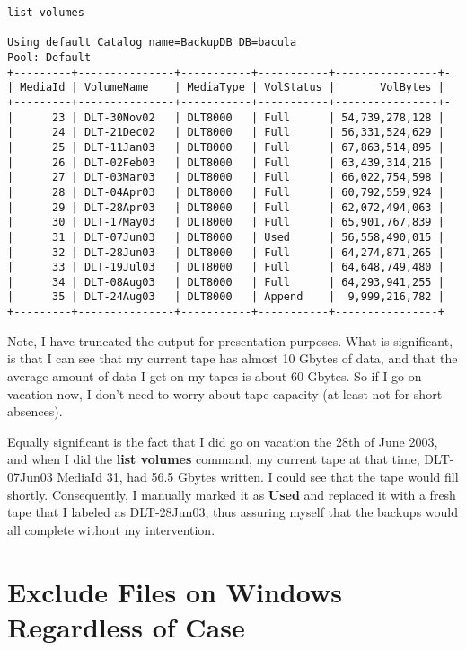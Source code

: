\footnotesize
\begin{verbatim}
list volumes
 
Using default Catalog name=BackupDB DB=bacula
Pool: Default
+---------+---------------+-----------+-----------+----------------+-
| MediaId | VolumeName    | MediaType | VolStatus |       VolBytes |
+---------+---------------+-----------+-----------+----------------+-
|      23 | DLT-30Nov02   | DLT8000   | Full      | 54,739,278,128 |
|      24 | DLT-21Dec02   | DLT8000   | Full      | 56,331,524,629 |
|      25 | DLT-11Jan03   | DLT8000   | Full      | 67,863,514,895 |
|      26 | DLT-02Feb03   | DLT8000   | Full      | 63,439,314,216 |
|      27 | DLT-03Mar03   | DLT8000   | Full      | 66,022,754,598 |
|      28 | DLT-04Apr03   | DLT8000   | Full      | 60,792,559,924 |
|      29 | DLT-28Apr03   | DLT8000   | Full      | 62,072,494,063 |
|      30 | DLT-17May03   | DLT8000   | Full      | 65,901,767,839 |
|      31 | DLT-07Jun03   | DLT8000   | Used      | 56,558,490,015 |
|      32 | DLT-28Jun03   | DLT8000   | Full      | 64,274,871,265 |
|      33 | DLT-19Jul03   | DLT8000   | Full      | 64,648,749,480 |
|      34 | DLT-08Aug03   | DLT8000   | Full      | 64,293,941,255 |
|      35 | DLT-24Aug03   | DLT8000   | Append    |  9,999,216,782 |
+---------+---------------+-----------+-----------+----------------+
\end{verbatim}
\normalsize

Note, I have truncated the output for presentation purposes. What is
significant, is that I can see that my current tape has almost 10 Gbytes of
data, and that the average amount of data I get on my tapes is about 60
Gbytes. So if I go on vacation now, I don't need to worry about tape capacity
(at least not for short absences). 

Equally significant is the fact that I did go on vacation the 28th of June
2003, and when I did the {\bf list volumes} command, my current tape at that
time, DLT-07Jun03 MediaId 31, had 56.5 Gbytes written. I could see that the
tape would fill shortly. Consequently, I manually marked it as {\bf Used} and
replaced it with a fresh tape that I labeled as DLT-28Jun03, thus assuring
myself that the backups would all complete without my intervention. 

\section{Exclude Files on Windows Regardless of Case}
\label{Case}

